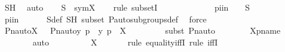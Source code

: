 \begin{isabellebody}
\ SH\ \isamarkupfalse%
\ auto\isanewline
\isanewline
\ \ \isamarkupfalse%
\ {\isachardoublequoteopen}S\ {\isasymsubseteq}\ sym{\isacharparenleft}{\kern0pt}X{\isacharparenright}{\kern0pt}{\isachardoublequoteclose}\ \isanewline
\ \ \isamarkupfalse%
{\isacharparenleft}{\kern0pt}rule\ subsetI{\isacharparenright}{\kern0pt}\isanewline
\ \ \ \ \isamarkupfalse%
\ {\isasympi}\ \isanewline
\ \ \ \ \isamarkupfalse%
\ piin\ {\isacharcolon}{\kern0pt}\ {\isachardoublequoteopen}{\isasympi}\ {\isasymin}\ S{\isachardoublequoteclose}\ \isanewline
\ \ \ \ \isamarkupfalse%
\ \isamarkupfalse%
\ piin{\isasymG}\ {\isacharcolon}{\kern0pt}\ {\isachardoublequoteopen}{\isasympi}\ {\isasymin}\ {\isasymG}{\isachardoublequoteclose}\ \isamarkupfalse%
\ S{\isacharunderscore}{\kern0pt}def\ SH\ {\isasymF}{\isacharunderscore}{\kern0pt}subset\ P{\isacharunderscore}{\kern0pt}auto{\isacharunderscore}{\kern0pt}subgroups{\isacharunderscore}{\kern0pt}def\ \isamarkupfalse%
\ force\isanewline
\isanewline
\ \ \ \ \isamarkupfalse%
\ {\isachardoublequoteopen}Pn{\isacharunderscore}{\kern0pt}auto{\isacharparenleft}{\kern0pt}{\isasympi}{\isacharparenright}{\kern0pt}{\isacharbackquote}{\kern0pt}X\ {\isacharequal}{\kern0pt}\ {\isacharbraceleft}{\kern0pt}\ {\isacharless}{\kern0pt}Pn{\isacharunderscore}{\kern0pt}auto{\isacharparenleft}{\kern0pt}{\isasympi}{\isacharparenright}{\kern0pt}{\isacharbackquote}{\kern0pt}y{\isacharcomma}{\kern0pt}\ {\isasympi}{\isacharbackquote}{\kern0pt}p{\isachargreater}{\kern0pt}\ {\isachardot}{\kern0pt}\ {\isacharless}{\kern0pt}y{\isacharcomma}{\kern0pt}\ p{\isachargreater}{\kern0pt}\ {\isasymin}\ X\ {\isacharbraceright}{\kern0pt}{\isachardoublequoteclose}\ \isanewline
\ \ \ \ \ \ \isamarkupfalse%
{\isacharparenleft}{\kern0pt}subst\ Pn{\isacharunderscore}{\kern0pt}auto{\isacharparenright}{\kern0pt}\isanewline
\ \ \ \ \ \ \isamarkupfalse%
\ Xpname\isanewline
\ \ \ \ \ \ \isamarkupfalse%
\ auto\isanewline
\ \ \ \ \isamarkupfalse%
\ \isamarkupfalse%
\ {\isachardoublequoteopen}{\isachardot}{\kern0pt}{\isachardot}{\kern0pt}{\isachardot}{\kern0pt}\ {\isacharequal}{\kern0pt}\ X{\isachardoublequoteclose}\ \isanewline
\ \ \ \ \isamarkupfalse%
\ {\isacharparenleft}{\kern0pt}rule\ equality{\isacharunderscore}{\kern0pt}iffI{\isacharcomma}{\kern0pt}\ rule\ iffI{\isacharparenright}{\kern0pt}\isanewline
\ \ \ \ \ \ \isamarkupfalse%

\end{isabellebody}
